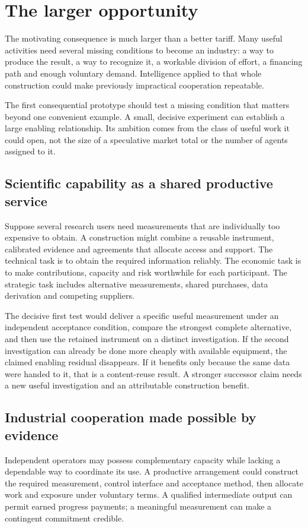 \section{The larger opportunity}\label{sec:horizon}
The motivating consequence is much larger than a better tariff. Many useful activities need several missing conditions to become an industry: a way to produce the result, a way to recognize it, a workable division of effort, a financing path and enough voluntary demand. Intelligence applied to that whole construction could make previously impractical cooperation repeatable.

The first consequential prototype should test a missing condition that matters beyond one convenient example. A small, decisive experiment can establish a large enabling relationship. Its ambition comes from the class of useful work it could open, not the size of a speculative market total or the number of agents assigned to it.

\subsection{Scientific capability as a shared productive service}
Suppose several research users need measurements that are individually too expensive to obtain. A construction might combine a reusable instrument, calibrated evidence and agreements that allocate access and support. The technical task is to obtain the required information reliably. The economic task is to make contributions, capacity and risk worthwhile for each participant. The strategic task includes alternative measurements, shared purchases, data derivation and competing suppliers.

The decisive first test would deliver a specific useful measurement under an independent acceptance condition, compare the strongest complete alternative, and then use the retained instrument on a distinct investigation. If the second investigation can already be done more cheaply with available equipment, the claimed enabling residual disappears. If it benefits only because the same data were handed to it, that is a content-reuse result. A stronger successor claim needs a new useful investigation and an attributable construction benefit.

\subsection{Industrial cooperation made possible by evidence}
Independent operators may possess complementary capacity while lacking a dependable way to coordinate its use. A productive arrangement could construct the required measurement, control interface and acceptance method, then allocate work and exposure under voluntary terms. A qualified intermediate output can permit earned progress payments; a meaningful measurement can make a contingent commitment credible.

